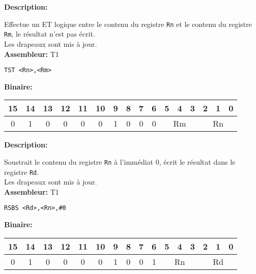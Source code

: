 
\textbf{Description: }

Effectue un ET logique entre le contenu du registre \texttt{Rn} et le contenu du registre \texttt{Rm}, le résultat n'est pas écrit.\\
Les drapeaux sont mis à jour.\\

\textbf{Assembleur:} T1

\begin{lstlisting}
TST <Rn>,<Rm>
\end{lstlisting}

\textbf{Binaire:}\\

\begin{tabular}{| c c c c c c c c c c c c c c c c |}
\hline
15 & 14 & 13 & 12 & 11 & 10 & \multicolumn{1}{|c}{9} & 8 & 7 & 6 & \multicolumn{1}{|c}{5} & 4 & 3 & \multicolumn{1}{|c}{2} & 1 & 0 \\
\hline
0 & 1 & 0 & 0 & 0 & 0 & \multicolumn{1}{|c}{1} & 0 & 0 & 0 & \multicolumn{3}{|c}{Rm} & \multicolumn{3}{|c|}{Rn} \\
\hline
\end{tabular}




\textbf{Description: }

Soustrait le contenu du registre \texttt{Rn} à l'immédiat 0, écrit le résultat dans le registre \texttt{Rd}.\\
Les drapeaux sont mis à jour.\\

\textbf{Assembleur:} T1

\begin{lstlisting}
RSBS <Rd>,<Rn>,#0
\end{lstlisting}

\textbf{Binaire:}\\

\begin{tabular}{| c c c c c c c c c c c c c c c c |}
\hline
15 & 14 & 13 & 12 & 11 & 10 & \multicolumn{1}{|c}{9} & 8 & 7 & 6 & \multicolumn{1}{|c}{5} & 4 & 3 & \multicolumn{1}{|c}{2} & 1 & 0 \\
\hline
0 & 1 & 0 & 0 & 0 & 0 & \multicolumn{1}{|c}{1} & 0 & 0 & 1 & \multicolumn{3}{|c}{Rn} & \multicolumn{3}{|c|}{Rd} \\
\hline
\end{tabular}



